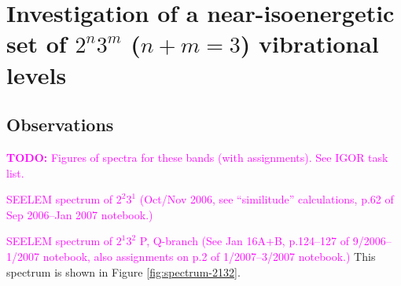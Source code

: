 \documentclass[12pt]{mitthesis}
\newcommand{\TODO} [1]{\textcolor{magenta}{\textbf{TODO:} #1}}
\newcommand{\POINT}[1]{\textcolor{magenta}{#1}}
\begin{document}










\section{Investigation of a near-isoenergetic set of $2^n3^m$ ($n+m=3$)
  vibrational levels}

\subsection{Observations}

\TODO{Figures of spectra for these bands (with assignments). See IGOR
  task list.}

\POINT{SEELEM spectrum of $2^2 3^1$ (Oct/Nov 2006, see ``similitude''
  calculations, p.62 of Sep 2006--Jan 2007 notebook.)}



\POINT{SEELEM spectrum of $2^1 3^2$ P, Q-branch (See Jan 16A+B,
  p.124--127 of 9/2006--1/2007 notebook, also assignments on p.2 of
  1/2007--3/2007 notebook.)}  This spectrum is shown in Figure
\ref{fig:spectrum-2132}.
\end{document}
